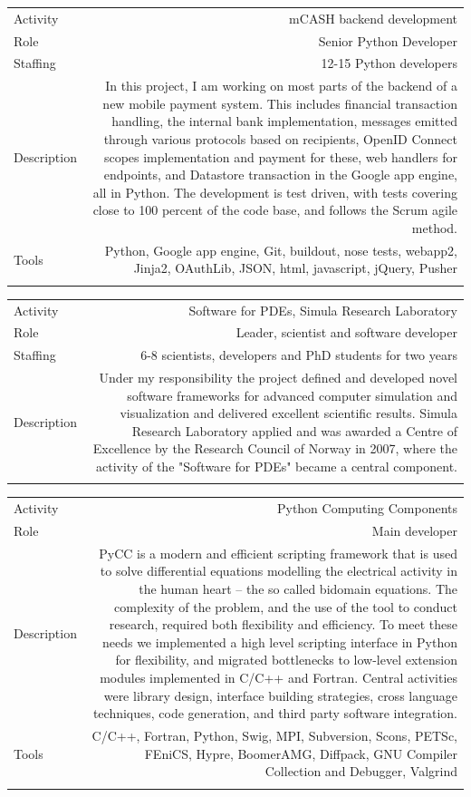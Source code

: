 \documentclass[english,a4paper,11pt]{article}
\begin{document}
\begin{tabular}{@{}LR}
Activity & mCASH backend development\\
Role & Senior Python Developer\\
Staffing & 12-15 Python developers\\
Description & In this project, I am working on most parts of the backend of a new mobile payment system. This includes financial transaction handling, the internal bank implementation, messages emitted through various protocols based on recipients, OpenID Connect scopes implementation and payment for these, web handlers for endpoints, and Datastore transaction in the Google app engine, all in Python. The development is test driven, with tests covering close to 100 percent of the code base, and follows the Scrum agile method. \\
Tools & Python, Google app engine, Git, buildout, nose tests, webapp2, Jinja2, OAuthLib, JSON, html, javascript, jQuery, Pusher\\ 
\addlinespace \bottomrule[.1pt] \addlinespace
   \end{tabular}

\begin{tabular}{@{}LR}
Activity & Software for PDEs, Simula Research Laboratory\\
Role & Leader, scientist and software developer\\
Staffing & 6-8 scientists, developers and PhD students for two years\\
Description & Under my responsibility the project defined and developed novel software frameworks for advanced computer simulation and visualization and delivered excellent scientific results. Simula Research Laboratory applied and was awarded a Centre of Excellence by the Research Council of Norway in 2007, where the activity of the "Software for PDEs" became a central component.\\ 
\addlinespace \bottomrule[.1pt] \addlinespace
   \end{tabular}

\begin{tabular}{@{}LR}
Activity & Python Computing Components\\
Role & Main developer\\
Description & PyCC is a modern and efficient scripting framework that is used to solve differential equations modelling the electrical activity in the human heart – the so called bidomain equations. The complexity of the problem, and the use of the tool to conduct research, required both flexibility and efficiency. To meet these needs we implemented a high level scripting interface in Python for flexibility, and migrated bottlenecks to low-level extension modules implemented in C/C++ and Fortran. Central activities were library design, interface building strategies, cross language techniques, code generation, and third party software integration.\\
Tools & C/C++, Fortran, Python, Swig, MPI, Subversion, Scons, PETSc, FEniCS, Hypre, BoomerAMG, Diffpack, GNU Compiler Collection and Debugger, Valgrind\\ 
\addlinespace \bottomrule[.1pt] \addlinespace
   \end{tabular}
\end{document}
